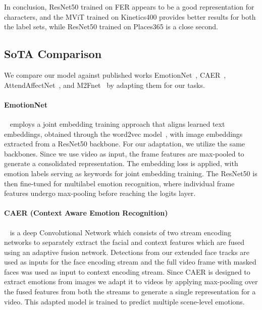 In conclusion, ResNet50 trained on FER appears to be a good representation for characters, and the MViT trained on Kinetics400 provides better results for both the label sets, while ResNet50 trained on Places365 is a close second.

\subsection{SoTA Comparison}
\label{sec:sota}




We compare our model against published works 
EmotionNet~\cite{WeiEmotionNet},
CAER~\cite{caer}, 
AttendAffectNet~\cite{attendaffectnet}, and
M2Fnet~\cite{m2fnet}
by adapting them for our tasks.

\paragraph{EmotionNet}~\cite{WeiEmotionNet}
employs a joint embedding training approach that aligns learned text embeddings, obtained through the word2vec model~\cite{MikolovWord2Vec}, with image embeddings extracted from a ResNet50 backbone. For our adaptation, we utilize the same backbones. Since we use video as input, the frame features are max-pooled to generate a consolidated representation. The embedding loss is applied, with emotion labels serving as keywords for joint embedding training. The ResNet50 is then fine-tuned for multilabel emotion recognition, where individual frame features undergo max-pooling before reaching the logits layer.

\paragraph{CAER (Context Aware Emotion Recognition)}~\cite{caer}
is a deep Convolutional Network which consists of two stream encoding networks to separately extract the facial and context features which are fused using an adaptive fusion network.
Detections from our extended face tracks are used as inputs for the face encoding stream and the full video frame with masked faces was used as input to context encoding stream.
Since CAER is designed to extract emotions from images we adapt it to videos by applying max-pooling over the fused features from both the streams to generate a single representation for a video.
This adapted model is trained to predict multiple scene-level emotions.

